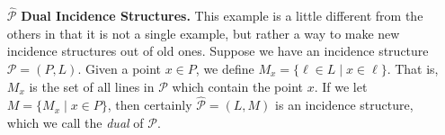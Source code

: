 \documentclass{article}
\begin{document}
\begin{itemize}
\item[$\widehat{\mathcal{P}}$] \textbf{Dual Incidence Structures.} This example is a little different from the others in that it is not a single example, but rather a way to make new incidence structures out of old ones. Suppose we have an incidence structure $\mathcal{P} = (P,L)$. Given a point $x \in P$, we define $M_x = \{ \ell \in L \mid x \in \ell \}$. That is, $M_x$ is the set of all lines in $\mathcal{P}$ which contain the point $x$. If we let $M = \{ M_x \mid x \in P \}$, then certainly $\widehat{\mathcal{P}} = (L, M)$ is an incidence structure, which we call the \emph{dual} of $\mathcal{P}$.
\end{itemize}
\end{document}
